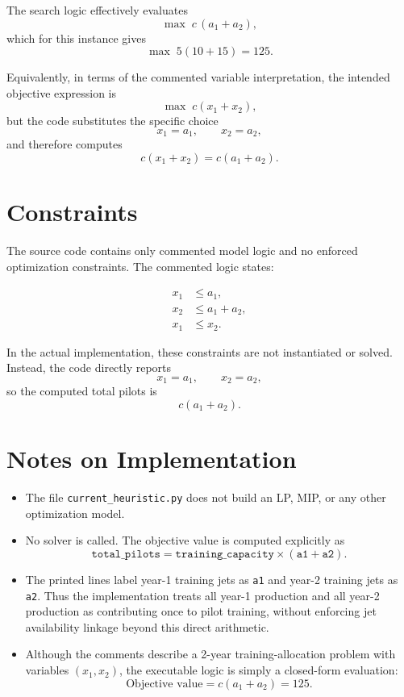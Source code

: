 The search logic effectively evaluates
\[
\max \; c\,(a_1+a_2),
\]
which for this instance gives
\[
\max \; 5(10+15)=125.
\]

Equivalently, in terms of the commented variable interpretation, the intended objective expression is
\[
\max \; c(x_1+x_2),
\]
but the code substitutes the specific choice
\[
x_1=a_1,\qquad x_2=a_2,
\]
and therefore computes
\[
c(x_1+x_2)=c(a_1+a_2).
\]

\section*{Constraints}

The source code contains only commented model logic and no enforced optimization constraints. The commented logic states:

\begin{align}
x_1 &\le a_1,\\
x_2 &\le a_1+a_2,\\
x_1 &\le x_2.
\end{align}

In the actual implementation, these constraints are not instantiated or solved. Instead, the code directly reports
\[
x_1=a_1,\qquad x_2=a_2,
\]
so the computed total pilots is
\[
c(a_1+a_2).
\]

\section*{Notes on Implementation}

\begin{itemize}
    \item The file \texttt{current\_heuristic.py} does not build an LP, MIP, or any other optimization model.
    \item No solver is called. The objective value is computed explicitly as
    \[
    \texttt{total\_pilots}=\texttt{training\_capacity}\times(\texttt{a1}+\texttt{a2}).
    \]
    \item The printed lines label year-1 training jets as \texttt{a1} and year-2 training jets as \texttt{a2}. Thus the implementation treats all year-1 production and all year-2 production as contributing once to pilot training, without enforcing jet availability linkage beyond this direct arithmetic.
    \item Although the comments describe a 2-year training-allocation problem with variables $(x_1,x_2)$, the executable logic is simply a closed-form evaluation:
    \[
    \text{Objective value} = c(a_1+a_2)=125.
    \]
\end{itemize}
